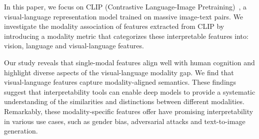In this paper, we focus on CLIP (Contrastive Language-Image Pretraining)~\citep{radford2021learning}, a visual-language representation model trained on massive image-text pairs. We investigate the modality association of features extracted from CLIP by introducing a modality metric that categorizes these interpretable features into: vision, language and visual-language features.

Our study reveals that single-modal features align well with human cognition and highlight diverse aspects of the visual-language modality gap. We find that visual-language features capture modality-aligned semantics. These findings suggest that interpretability tools can enable deep models to provide a systematic understanding of the similarities and distinctions between different modalities. Remarkably, these modality-specific features offer have promising interpretability in various use cases, such as gender bias, adversarial attacks and text-to-image generation.








